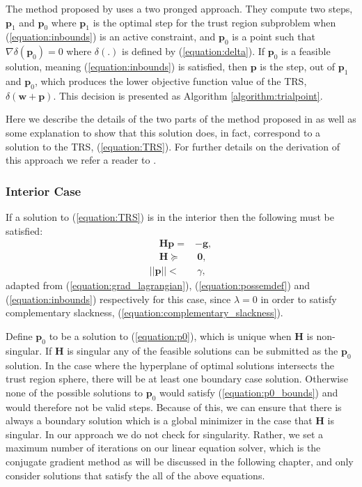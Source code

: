 \documentclass[letterpaper,12pt,titlepage,oneside,final]{book}
\begin{document}
	The method proposed by \cite{adachi.paper} uses a two pronged approach. They compute two steps, $\mathbf{p}_{1}$ and $\mathbf{p}_{0}$ where $\mathbf{p}_{1}$ is the optimal step for the trust region subproblem when (\ref{equation:inbounds}) is an active constraint, and $\mathbf{p}_{0}$ is a point such that $\nabla\delta(\mathbf{p}_{0}) = 0$ where $\delta(.)$ is defined by (\ref{equation:delta}). If $\mathbf{p}_{0}$ is a feasible solution, meaning (\ref{equation:inbounds}) is satisfied, then $\mathbf{p}$ is the step, out of $\mathbf{p}_{1}$ and $\mathbf{p}_{0}$, which produces the lower objective function value of the TRS, $\delta(\mathbf{w + p})$. This decision is presented as Algorithm \ref{algorithm:trialpoint}.
	
	Here we describe the details of the two parts of the method proposed in \cite{adachi.paper} as well as some explanation to show that this solution does, in fact, correspond to 
	a solution to the TRS, (\ref{equation:TRS}). For further details on the derivation of this approach we refer a reader to \cite{adachi.paper}. 
	
	\subsubsection{Interior Case}
	
	If a solution to (\ref{equation:TRS}) is in the interior then the following must be satisfied:
	\begin{subequations}
		\begin{align}
		\quad \mathbf{Hp} = & -\mathbf{g}, \label{equation:p0} \\
		\quad \mathbf{H} \succeq & \ \mathbf{0},\label{equation:p0_posdef} \\ 
		||\mathbf{p}|| < & \ \gamma, \label{equation:p0_bounds}  
		\end{align}
	\end{subequations}
	adapted from (\ref{equation:grad_lagrangian}), (\ref{equation:possemdef}) and (\ref{equation:inbounds}) respectively for this case, since $\lambda = 0$ in order to satisfy complementary slackness, (\ref{equation:complementary_slackness}).
	
	Define $\mathbf{p}_{0}$ to be a solution to (\ref{equation:p0}), which is unique when $\mathbf{H}$ is non-singular. If $\mathbf{H}$ is singular any of the feasible solutions can be submitted as the $\mathbf{p}_{0}$ solution. In the case where the hyperplane of optimal solutions intersects the trust region sphere, there will be at least one boundary case solution. Otherwise none of the possible solutions to $\mathbf{p}_{0}$ would satisfy (\ref{equation:p0_bounds}) and would therefore not be valid steps. Because of this, we can ensure that there is always a boundary solution which is a global minimizer in the case that $\mathbf{H}$ is singular. In our approach we do not check for singularity. Rather, we set a maximum number of iterations on our linear equation solver, which is the conjugate gradient method as will be discussed in the following chapter, and only consider solutions that satisfy the all of the above equations. 
	
\end{document}
